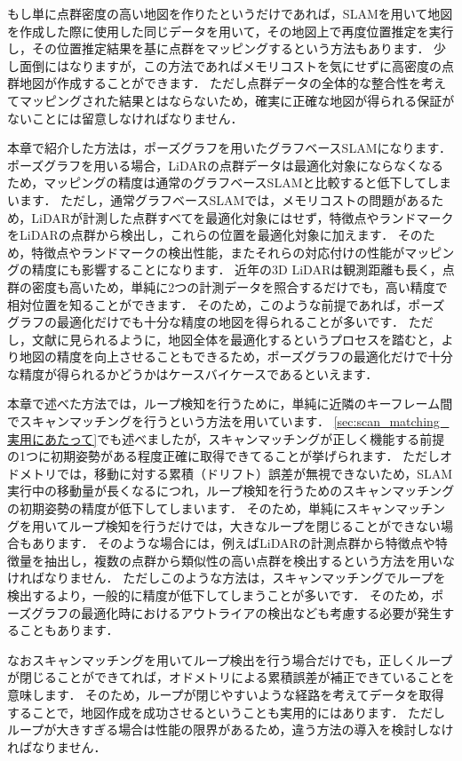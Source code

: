 もし単に点群密度の高い地図を作りたというだけであれば，SLAMを用いて地図を作成した際に使用した同じデータを用いて，その地図上で再度位置推定を実行し，その位置推定結果を基に点群をマッピングするという方法もあります．
少し面倒にはなりますが，この方法であればメモリコストを気にせずに高密度の点群地図が作成することができます．
ただし点群データの全体的な整合性を考えてマッピングされた結果とはならないため，確実に正確な地図が得られる保証がないことには留意しなければなりません．

本章で紹介した方法は，ポーズグラフを用いたグラフベースSLAMになります．
ポーズグラフを用いる場合，LiDARの点群データは最適化対象にならなくなるため，マッピングの精度は通常のグラフベースSLAMと比較すると低下してしまいます．
ただし，通常グラフベースSLAMでは，メモリコストの問題があるため，LiDARが計測した点群すべてを最適化対象にはせず，特徴点やランドマークをLiDARの点群から検出し，これらの位置を最適化対象に加えます．
そのため，特徴点やランドマークの検出性能，またそれらの対応付けの性能がマッピングの精度にも影響することになります．
近年の3D LiDARは観測距離も長く，点群の密度も高いため，単純に2つの計測データを照合するだけでも，高い精度で相対位置を知ることができます．
そのため，このような前提であれば，ポーズグラフの最適化だけでも十分な精度の地図を得られることが多いです．
ただし，文献\cite{}に見られるように，地図全体を最適化するというプロセスを踏むと，より地図の精度を向上させることもできるため，ポーズグラフの最適化だけで十分な精度が得られるかどうかはケースバイケースであるといえます．

本章で述べた方法では，ループ検知を行うために，単純に近隣のキーフレーム間でスキャンマッチングを行うという方法を用いています．
\ref{sec:scan_matching_実用にあたって}でも述べましたが，スキャンマッチングが正しく機能する前提の1つに初期姿勢がある程度正確に取得できてることが挙げられます．
ただしオドメトリでは，移動に対する累積（ドリフト）誤差が無視できないため，SLAM実行中の移動量が長くなるにつれ，ループ検知を行うためのスキャンマッチングの初期姿勢の精度が低下してしまいます．
そのため，単純にスキャンマッチングを用いてループ検知を行うだけでは，大きなループを閉じることができない場合もあります．
そのような場合には，例えばLiDARの計測点群から特徴点や特徴量を抽出し，複数の点群から類似性の高い点群を検出するという方法を用いなければなりません．
ただしこのような方法は，スキャンマッチングでループを検出するより，一般的に精度が低下してしまうことが多いです．
そのため，ポーズグラフの最適化時におけるアウトライアの検出なども考慮する必要が発生することもあります．

なおスキャンマッチングを用いてループ検出を行う場合だけでも，正しくループが閉じることができてれば，オドメトリによる累積誤差が補正できていることを意味します．
そのため，ループが閉じやすいような経路を考えてデータを取得することで，地図作成を成功させるということも実用的にはあります．
ただしループが大きすぎる場合は性能の限界があるため，違う方法の導入を検討しなければなりません．





